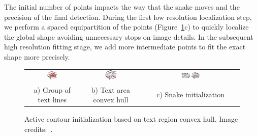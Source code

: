 The initial number of points impacts the way that the snake moves and the precision of the final detection.
During the first low resolution localization step, we perform a spaced equipartition of the points (Figure~\ref{fig:se:paragraphs}c) to quickly localize the global shape avoiding unnecessary stops on image details.
In the subsequent high resolution fitting stage, we add more intermediate points to fit the exact shape more precisely.

	\begin{figure}[!ht]%
	\begin{center}
	  \begin{tabular}{ccc}
	  \includegraphics[trim= 0mm 0mm 0mm 0mm, clip, width=0.20\textwidth]{group_lines.png}&
	  \includegraphics[trim= 0mm 0mm 0mm 0mm, clip, width=0.20\textwidth]{convex_hull.png}&
	  \includegraphics[trim= 48mm 0mm 0mm 0mm, clip, width=0.20\textwidth]{snake_init.png} \\ 
	  \footnotesize a) Group of text lines	& \footnotesize b) Text area convex hull 	& \footnotesize c) Snake initialization 
	  \end{tabular}
	\caption[Active contour initialization based on text region convex hull]{Active contour initialization based on text region convex hull. Image credits:~\cite{Bubble09}.}
		\label{fig:se:paragraphs}
	\end{center}
	\end{figure}	


